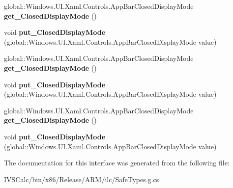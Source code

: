 \begin{DoxyCompactItemize}
global\+::\+Windows.\+U\+I.\+Xaml.\+Controls.\+App\+Bar\+Closed\+Display\+Mode {\bfseries get\+\_\+\+Closed\+Display\+Mode} ()
\item 
\mbox{\label{interface_windows_1_1_u_i_1_1_xaml_1_1_controls_1_1_i_app_bar2_a49e6938236b9ffe3ed9c3cc9f30ca44f}} 
void {\bfseries put\+\_\+\+Closed\+Display\+Mode} (global\+::\+Windows.\+U\+I.\+Xaml.\+Controls.\+App\+Bar\+Closed\+Display\+Mode value)
\item 
\mbox{\label{interface_windows_1_1_u_i_1_1_xaml_1_1_controls_1_1_i_app_bar2_a5c676f47f4b7b2e9ffd1e86aa2d91647}} 
global\+::\+Windows.\+U\+I.\+Xaml.\+Controls.\+App\+Bar\+Closed\+Display\+Mode {\bfseries get\+\_\+\+Closed\+Display\+Mode} ()
\item 
\mbox{\label{interface_windows_1_1_u_i_1_1_xaml_1_1_controls_1_1_i_app_bar2_a49e6938236b9ffe3ed9c3cc9f30ca44f}} 
void {\bfseries put\+\_\+\+Closed\+Display\+Mode} (global\+::\+Windows.\+U\+I.\+Xaml.\+Controls.\+App\+Bar\+Closed\+Display\+Mode value)
\item 
\mbox{\label{interface_windows_1_1_u_i_1_1_xaml_1_1_controls_1_1_i_app_bar2_a5c676f47f4b7b2e9ffd1e86aa2d91647}} 
global\+::\+Windows.\+U\+I.\+Xaml.\+Controls.\+App\+Bar\+Closed\+Display\+Mode {\bfseries get\+\_\+\+Closed\+Display\+Mode} ()
\item 
\mbox{\label{interface_windows_1_1_u_i_1_1_xaml_1_1_controls_1_1_i_app_bar2_a49e6938236b9ffe3ed9c3cc9f30ca44f}} 
void {\bfseries put\+\_\+\+Closed\+Display\+Mode} (global\+::\+Windows.\+U\+I.\+Xaml.\+Controls.\+App\+Bar\+Closed\+Display\+Mode value)
\end{DoxyCompactItemize}


The documentation for this interface was generated from the following file\+:\begin{DoxyCompactItemize}
\item 
I\+V\+S\+Calc/bin/x86/\+Release/\+A\+R\+M/ilc/Safe\+Types.\+g.\+cs\end{DoxyCompactItemize}
